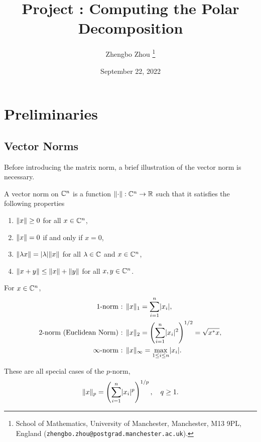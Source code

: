 \documentclass[12pt]{article}
\title{Project : Computing the Polar Decomposition}
\author{Zhengbo Zhou%
    \thanks{%
        School of Mathematics,
        University of Manchester,
        Manchester, M13 9PL, England
        (\texttt{zhengbo.zhou@postgrad.manchester.ac.uk}).
    }
}
\date{September 22, 2022}
\begin{document}
\maketitle

\section{Preliminaries}\label{sec:norms-svd}

\subsection{Vector Norms} \label{subsec:vector-norms}

Before introducing the matrix norm, a brief illustration of the vector norm is necessary.

\begin{definition}
   \label{def:vector-norm}
  A vector norm on $\mathbb{C}^n$ is a function $\|{\cdot}\| : \mathbb{C}^n \to \mathbb{R}$ such that it satisfies the following properties
  \begin{enumerate}
    \item $\|{x}\| \geq 0$ for all $x\in\mathbb{C}^n$,
    \item $\|{x}\| = 0$ if and only if $x = 0$,
    \item $\|{\lambda x}\| = \lvert\lambda\rvert \|{x}\|$ for all $\lambda \in \mathbb{C}$ and $x \in \mathbb{C}^n$,
    \item $\|{x + y}\| \leq \|{x}\| + \|{y}\|$ for all $x,y\in \mathbb{C}^n$.
  \end{enumerate}
\end{definition}

\begin{example}
    For $x\in\mathbb{C}^n$, 
    \begin{equation}\notag
        \begin{aligned}
            \text{1-norm : }& \|{x}\|_1 = \sum_{i = 1}^n \lvert x_i\rvert,\\
            \text{2-norm (Euclidean Norm) : }& \|{x}\|_2 = \left(\sum_{i = 1}^n \lvert x_i\rvert^2\right)^{1/2} = \sqrt{x^* x},\\
            \text{$\infty$-norm : } & \|{x}\|_{\infty} = \max_{1\leq i \leq n} \lvert x_i\rvert.
        \end{aligned}
    \end{equation}
    
    These are all special cases of the $p$-norm,
    \begin{equation}\label{eq:vector-p-norm}
        \|{x}\|_p = \left(\sum_{i = 1}^n \lvert x_i\rvert^p\right)^{1/p},\quad q \geq 1.
    \end{equation}
\end{example}
\end{document}
